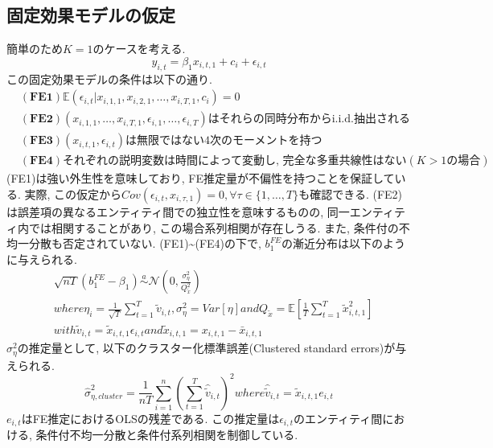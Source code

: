 \documentclass[paper=a4paper,fontsize=10pt]{jlreq}
\begin{document}
\subsection{固定効果モデルの仮定}
簡単のため$K = 1$のケースを考える.
\begin{equation*}
  y_{i,t} = \beta_1 {x}_{i,t,1} + c_i + \epsilon_{i,t}
\end{equation*}
この固定効果モデルの条件は以下の通り.
\begin{align*}
  &\mathbf{(FE1)}　\mathbb{E}(\epsilon_{i,t}|x_{i,1,1}, x_{i,2,1}, \dots, x_{i,T,1}, c_i)=0\\
  &\mathbf{(FE2)}　(x_{i,1,1}, \dots, x_{i,T,1}, \epsilon_{i,1}, \dots, \epsilon_{i,T}) \text{はそれらの同時分布からi.i.d.抽出される}\\
  &\mathbf{(FE3)}　(x_{i,t,1}, \epsilon_{i,t})\text{は無限ではない4次のモーメントを持つ}\\
  &\mathbf{(FE4)}　\text{それぞれの説明変数は時間によって変動し, 完全な多重共線性はない} (K > 1の場合)
\end{align*}
(FE1)は強い外生性を意味しており, FE推定量が不偏性を持つことを保証している. 実際, この仮定から$Cov(\epsilon_{i,t}, x_{i,\tau,1}) = 0, \forall\tau\in\{1,\dots,T\}$も確認できる. (FE2)は誤差項の異なるエンティティ間での独立性を意味するものの, 同一エンティティ内では相関することがあり, この場合系列相関が存在しうる. また, 条件付の不均一分散も否定されていない. (FE1)\sim(FE4)の下で, $b_1^{FE}$の漸近分布は以下のように与えられる.
\begin{align*}
  &\sqrt{nT}(b_1^{FE} - \beta_1) \overset{a}{\sim} \mathcal{N}({0}, \frac{\sigma_\eta^2}{Q_{\tilde{x}}^2})\\
  &where　\eta_i = \frac{1}{\sqrt{T}}\sum_{t=1}^{T}\tilde{v}_{i,t},　\sigma_\eta^2 = Var[\eta]　and　Q_{\tilde{x}} = \mathbb{E}[\frac{1}{T}\sum_{t=1}^{T}\tilde{x}_{i,t,1}^2]\\
  &with　\tilde{v}_{i,t} = \tilde{x}_{i,t,1} \epsilon_{i,t}　and　\tilde{x}_{i,t,1} = {x}_{i,t,1} - \bar{x}_{i,t,1}
\end{align*}
$\sigma_\eta^2$の推定量として, 以下のクラスター化標準誤差(Clustered standard errors)が与えられる.
\begin{equation*}
  \hat{\sigma}_{\eta, cluster}^2 = \frac{1}{nT} \sum_{i=1}^{n} (\sum_{t=1}^{T}\hat{\tilde{v}}_{i,t})^2　where　\hat{\tilde{v}}_{i,t} = \tilde{x}_{i,t,1} e_{i,t}
\end{equation*}
$e_{i,t}$はFE推定におけるOLSの残差である. この推定量は$\epsilon_{i,t}$のエンティティ間における, 条件付不均一分散と条件付系列相関を制御している.\\
\end{document}
